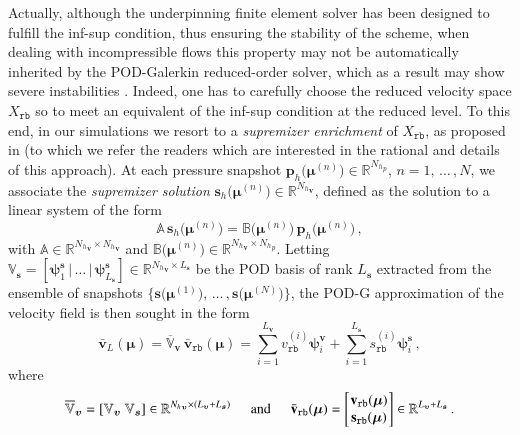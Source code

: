 \documentclass{elsarticle}
\numberwithin{equation}{section}
\theoremstyle{theorem}
\theoremstyle{definition}
\theoremstyle{remark}
\theoremstyle{proposition}
\numberwithin{figure}{section}
\newcommand{\bg}[1]{\boldsymbol{#1}}
\begin{document}
		Actually, although the underpinning finite element solver has been designed to fulfill the inf-sup condition, thus ensuring the stability of the scheme, when dealing with incompressible flows this property may not be automatically inherited by the POD-Galerkin reduced-order solver, which as a result may show severe instabilities \cite{Bur06}. Indeed, one has to carefully choose the reduced velocity space $X_{\texttt{rb}}$ so to meet an equivalent of the inf-sup condition at the reduced level. To this end, in our simulations we resort to a \emph{supremizer enrichment} of $X_{\texttt{rb}}$, as proposed in \cite{Bal14} (to which we refer the readers which are interested in the rational and details of this approach). At each pressure snapshot $\mathbf{p}_h \big( \bg{\mu}^{(n)} \big) \in \mathbb{R}^{{N_h}_p}$, $n = 1, \, \ldots \, , N$, we associate the \emph{supremizer solution} $\mathbf{s}_h \big( \bg{\mu}^{(n)} \big) \in \mathbb{R}^{{N_h}_{\bg{v}}}$, defined as the solution to a linear system of the form
		\begin{equation*}
			\mathbb{A} \, \mathbf{s}_h \big( \bg{\mu}^{(n)} \big) = \mathbb{B} \big( \bg{\mu}^{(n)} \big) \, \mathbf{p}_h \big( \bg{\mu}^{(n)} \big) \, ,
		\end{equation*}
		with $\mathbb{A} \in \mathbb{R}^{{N_h}_{\bg{v}} \times {N_h}_{\bg{v}}}$ and $\mathbb{B} \big( \bg{\mu}^{(n)} \big) \in \mathbb{R}^{{N_h}_{\bg{v}} \times {N_h}_p}$. Letting $\mathbb{V}_{\bg{s}} = \left[ \bg{\psi}_1^{\bg{s}} \, \big| \, \ldots \, \big| \, \bg{\psi}_{L_{\bg{s}}}^{\bg{s}} \right] \in \mathbb{R}^{{N_h}_{\bg{v}} \times L_{\bg{s}}}$ be the POD basis of rank $L_{\bg{s}}$ extracted from the ensemble of snapshots $\lbrace \mathbf{s} \big( \bg{\mu}^{(1)} \big) , \, \ldots \, , \mathbf{s} \big( \bg{\mu}^{(N)} \big) \rbrace$, the POD-G approximation of the velocity field is then sought in the form
		\begin{equation*}
			\bar{\mathbf{v}}_L(\bg{\mu}) = \overline{\mathbb{V}}_{\bg{v}} \, \bar{\mathbf{v}}_{\texttt{rb}}(\bg{\mu}) = \sum_{i = 1}^{L_{\bg{v}}} v_{\texttt{rb}}^{(i)} \bg{\psi}_i^{\bg{v}} + \sum_{i = 1}^{L_{\bg{s}}} s_{\texttt{rb}}^{(i)} \bg{\psi}_i^{\bg{s}} \, ,
		\end{equation*} 
		where
		\begin{equation*}
			\overline{\mathbb{V}}_{\bg{v}} = \left[ \mathbb{V}_{\bg{v}} ~ \mathbb{V}_{\bg{s}} \right] \in \mathbb{R}^{{N_h}_{\bg{v}} \times (L_{\bg{v}} + L_{\bg{s}})} \hspace*{0.5cm} \text{and} \hspace*{0.5cm} \bar{\mathbf{v}}_{\texttt{rb}}(\bg{\mu}) =
			\begin{bmatrix}
			\hspace*{-0.15cm}
			\begin{array}{c}
				\mathbf{v}_{\texttt{rb}}(\bg{\mu}) \\
				\mathbf{s}_{\texttt{rb}}(\bg{\mu})
			\end{array} 
			\hspace*{-0.15cm}
			\end{bmatrix} 
			\in \mathbb{R}^{L_{\bg{v}} + L_{\bg{s}}} \, .
		\end{equation*}
\end{document}
